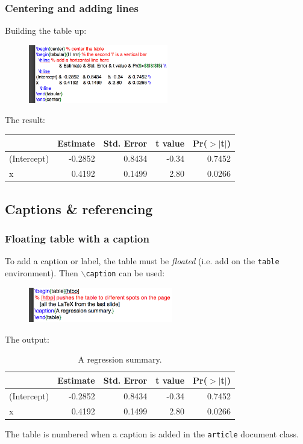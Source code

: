 \documentclass[slidestop,compress,mathserif]{beamer}
\begin{document}
\begin{frame} \frametitle{Centering and adding lines}
Building the table up:
\begin{figure}[htbp]
   \centering
   \includegraphics[height=1.0in]{basicsOfLatex/tabTable/centeredTable}
\end{figure}
The result: \\
\vspace{0.3cm}
\begin{center} %
\begin{tabular}{l | rrrr} %
  \hline %
 		           & Estimate & Std. Error & t value & Pr($>$$|$t$|$) \\
  \hline
(Intercept) & -0.2852   & 0.8434     & -0.34    & 0.7452 \\
x                & 0.4192    & 0.1499     & 2.80     & 0.0266 \\
   \hline
\end{tabular}
\end{center}
\end{frame}

\subsection[Captions \& referencing]{Captions \& referencing}
\begin{frame} \frametitle{Floating table with a caption}
To add a caption or label, the table must be \emph{floated} (i.e. add on the \texttt{\color{highlight}table} environment). Then \texttt{\color{command}$\backslash$caption} can be used:
\begin{figure}[htbp]
   \centering
   \includegraphics[height=0.6in]{basicsOfLatex/tabTable/floatTable}
\end{figure}
The output:
\begin{table}[htbp]
\begin{center} %
\begin{tabular}{l | rrrr} %
  \hline %
 		           & Estimate & Std. Error & t value & Pr($>$$|$t$|$) \\
  \hline
(Intercept) & -0.2852   & 0.8434     & -0.34    & 0.7452 \\
x                & 0.4192    & 0.1499     & 2.80     & 0.0266 \\
   \hline
\end{tabular}
\end{center}
\caption{A regression summary.}
\end{table}
The table is numbered when a caption is added in the \texttt{\color{highlight}article} document class.
\end{frame}
\end{document}
